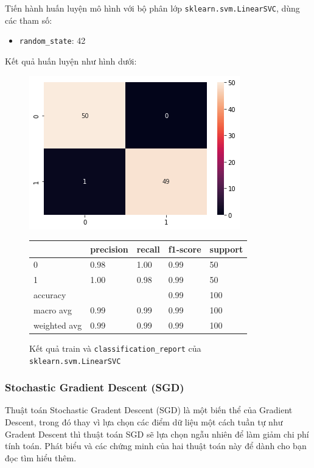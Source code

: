 \documentclass[12pt]{article}
\begin{document}
Tiến hành huấn luyện mô hình với bộ phân lớp \texttt{sklearn.svm.LinearSVC}, dùng các tham số:
\begin{itemize}
\item \texttt{random\_state}: 42
\end{itemize}
Kết quả huấn luyện như hình dưới:
\begin{figure}[H]
	\begin{multicols}{2}
		\includegraphics[scale=.5]{img/train-lsvc-result.png}

		\begin{table}[H]
			\begin{tabular}{l l l l l}
				\hline
				& precision & recall & f1-score & support \\
				\hline
				0 & 0.98 & 1.00 & 0.99 & 50 \\
				1 & 1.00 & 0.98 & 0.99 & 50 \\
				accuracy &   &   & 0.99 & 100 \\
				macro avg & 0.99 & 0.99 & 0.99 & 100 \\
				weighted avg & 0.99 & 0.99 & 0.99 & 100 \\
				\hline
			\end{tabular}
		\end{table}
	\end{multicols}
	\caption{Kết quả train và \texttt{classification\_report} của \texttt{sklearn.svm.LinearSVC}}
\end{figure}

\subsubsection{Stochastic Gradient Descent (SGD)}
Thuật toán Stochastic Gradent Descent (SGD) là một biến thể của Gradient Descent, trong đó thay vì lựa chọn các điểm dữ liệu một cách tuần tự như Gradent Descent thì thuật toán SGD sẽ lựa chọn ngẫu nhiên để làm giảm chi phí tính toán. Phát biểu và các chứng minh của hai thuật toán này để dành cho bạn đọc tìm hiểu thêm.
\end{document}
